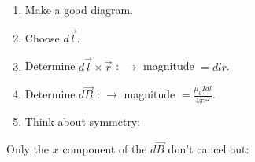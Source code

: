 \documentclass[aspectratio=169,
hyperref={colorlinks,urlcolor=blue}
]{beamer}
\begin{document}

{
\begin{enumerate}
\item Make a good diagram.
\item Choose $d\vec l$.
\item Determine $d \vec l\times \vec r$ : $\rightarrow$ magnitude  $=dl r$.
\item Determine $d\vec B$ : $\rightarrow$ magnitude $=\frac{\mu_0Idl}{4\pi r^2}$.
\item Think about symmetry:
\end{enumerate}
Only the $x$ component of the $d\vec B$ don't cancel out:
}
\end{document}
